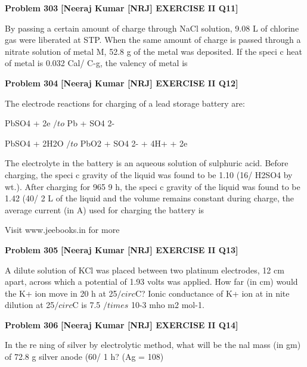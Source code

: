 \begin{problembox}
\textbf{Problem 303} \hfill \textbf{[Neeraj Kumar [NRJ] EXERCISE II Q11]}
\label{q:ext-nrj_all_questions-303}

By passing a certain amount of charge through 
NaCl solution, 9.08 L of chlorine gas were 
liberated at STP. When the same amount of charge 
is passed through a nitrate solution of metal M, 
52.8 g of the metal was deposited. If the speci  c 
heat of metal is 0.032 Cal/ C-g, the valency of 
metal is
\end{problembox}

\begin{problembox}
\textbf{Problem 304} \hfill \textbf{[Neeraj Kumar [NRJ] EXERCISE II Q12]}
\label{q:ext-nrj_all_questions-304}

The electrode reactions for charging of a lead 
storage battery are:
 
  PbSO4 + 2e $/to$ Pb + SO4
2-
 
   PbSO4 + 2H2O $/to$ PbO2 + SO4
2- + 4H+ + 2e
 
 The electrolyte in the battery is an aqueous solution 
of sulphuric acid. Before charging, the speci  c 
gravity of the liquid was found to be 1.10 (16/%
H2SO4 by wt.). After charging for 965
9 h, the 
speci  c gravity of the liquid was found to be 1.42 
(40/%
2 L of the liquid and the volume remains constant 
during charge, the average current (in A) used for 
charging the battery is
 
 
Visit www.jeebooks.in for more
\end{problembox}

\begin{problembox}
\textbf{Problem 305} \hfill \textbf{[Neeraj Kumar [NRJ] EXERCISE II Q13]}
\label{q:ext-nrj_all_questions-305}

A dilute solution of KCl was placed between two 
platinum electrodes, 12 cm apart, across which a 
potential of 1.93 volts was applied. How far (in 
cm) would the K+ ion move in 20 h at 25$/circ$C? Ionic 
conductance of K+ ion at in  nite dilution at 25$/circ$C 
is 7.5 $/times$ 10-3 mho m2 mol-1.
\end{problembox}

\begin{problembox}
\textbf{Problem 306} \hfill \textbf{[Neeraj Kumar [NRJ] EXERCISE II Q14]}
\label{q:ext-nrj_all_questions-306}

In the re  ning of silver by electrolytic method, what 
will be the   nal mass (in gm) of 72.8 g silver anode 
(60/%
1 h? (Ag = 108)
\end{problembox}

